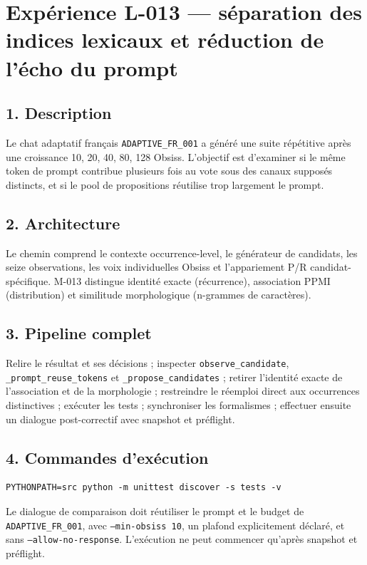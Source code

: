 \documentclass[11pt,a4paper]{report}
\begin{document}
\section[Expérience L-013 — indices lexicaux]{Expérience L-013 — séparation des indices lexicaux et réduction de l'écho du prompt}
\label{exp:l013}

\subsection*{1. Description}
Le chat adaptatif français \texttt{ADAPTIVE\_FR\_001} a généré une suite répétitive après une croissance 10, 20, 40, 80, 128 Obsiss. L'objectif est d'examiner si le même token de prompt contribue plusieurs fois au vote sous des canaux supposés distincts, et si le pool de propositions réutilise trop largement le prompt.

\subsection*{2. Architecture}
Le chemin comprend le contexte occurrence-level, le générateur de candidats, les seize observations, les voix individuelles Obsiss et l'appariement P/R candidat-spécifique. M-013 distingue identité exacte (récurrence), association PPMI (distribution) et similitude morphologique (n-grammes de caractères).

\subsection*{3. Pipeline complet}
Relire le résultat et ses décisions ; inspecter \texttt{observe\_candidate}, \texttt{\_prompt\_reuse\_tokens} et \texttt{\_propose\_candidates} ; retirer l'identité exacte de l'association et de la morphologie ; restreindre le réemploi direct aux occurrences distinctives ; exécuter les tests ; synchroniser les formalismes ; effectuer ensuite un dialogue post-correctif avec snapshot et préflight.

\subsection*{4. Commandes d'exécution}
\begin{verbatim}
PYTHONPATH=src python -m unittest discover -s tests -v
\end{verbatim}
Le dialogue de comparaison doit réutiliser le prompt et le budget de \texttt{ADAPTIVE\_FR\_001}, avec \texttt{--min-obsiss 10}, un plafond explicitement déclaré, et sans \texttt{--allow-no-response}. L'exécution ne peut commencer qu'après snapshot et préflight.
\end{document}
